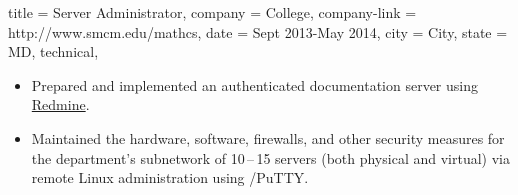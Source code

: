 \begin{position}
  {
    title   = Server Administrator,
    company = \StMarys College,
    company-link = http://www.smcm.edu/mathcs,
    date    = Sept 2013-May 2014,
    city    = \StMarys City,
    state   = MD,
    technical,
  }

\begin{itemize}
\item Prepared and implemented an authenticated documentation server using \href{http://www.redmine.org}{Redmine}.
\item Maintained the hardware, software, firewalls, and other security measures
  for the department's subnetwork of 10\,--\,15 servers (both physical and virtual) via remote Linux administration using \slash PuTTY.
\end{itemize}
\end{position}
